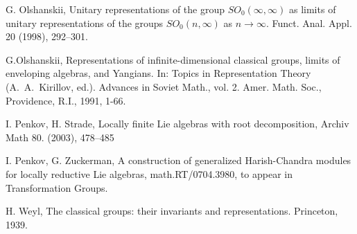 \documentclass[12pt,reqno]{amsart}
\numberwithin{equation}{section}
\theoremstyle{plain}
\theoremstyle{definition}
\begin{document}
\begin{thebibliography}{}
G. Olshanskii, %
Unitary representations of the group $SO_0(\infty,\infty)$ as limits
of unitary representations of the groups $SO_0(n,\infty)$ as $n\to
\infty$. Funct. Anal. Appl. 20 (1998), 292--301.

G.Olshanskii, %
Representations of infinite-dimensional classical groups, limits of enveloping algebras, and Yangians.
In: Topics in Representation Theory (A.~A.~Kirillov, ed.).
Advances in Soviet Math., vol. 2. Amer. Math. Soc., Providence, R.I., 1991, 1-66.


I. Penkov, H. Strade, %
Locally finite Lie algebras with root decomposition, Archiv Math 80.
(2003), 478--485


I. Penkov, G. Zuckerman, %
A construction of generalized Harish-Chandra modules for locally
reductive Lie algebras, math.RT/0704.3980, to appear in Transformation Groups.

H. Weyl, %
The classical groups: their invariants and representations.
Princeton, 1939.



\end{thebibliography}
\end{document}

